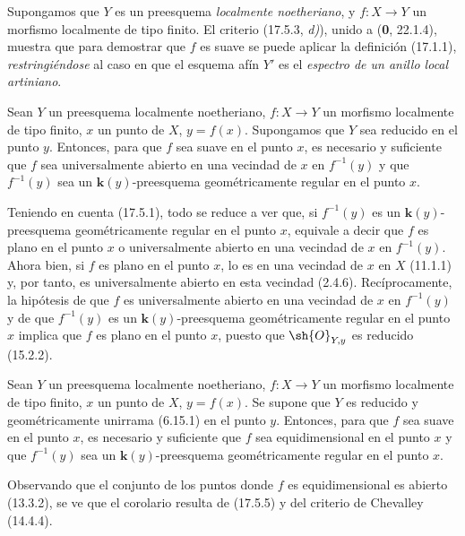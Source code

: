 \begin{remark}[17.5.4]
\label{IV.17.5.4}
Supongamos que $Y$ es un preesquema \emph{localmente noetheriano}, y $f:X\to Y$ un morfismo localmente de tipo finito. El criterio (17.5.3, \emph{d)}), unido a (\textbf 0, 22.1.4), muestra que para demostrar que $f$ es suave se puede aplicar la definición (17.1.1), \emph{restringiéndose} al caso en que el esquema afín $Y'$ es el \emph{espectro de un anillo local artiniano}.
\end{remark}

\begin{proposition}[17.5.5]
\label{IV.17.5.5}
Sean $Y$ un preesquema localmente noetheriano, $f:X\to Y$ un morfismo localmente de tipo finito, $x$ un punto de $X$, $y=f(x)$. Supongamos que $Y$ sea \textup{reducido} en el punto $y$. Entonces, para que $f$ sea suave en el punto $x$, es necesario y suficiente que $f$ sea universalmente abierto en una vecindad de $x$ en $f^{-1}(y)$ y que $f^{-1}(y)$ sea un $\boldsymbol{k}(y)$-preesquema geométricamente regular en el punto $x$.
\end{proposition}

Teniendo en cuenta (17.5.1), todo se reduce a ver que, si $f^{-1}(y)$ es un $\boldsymbol{k}(y)$-preesquema geométricamente regular en el punto $x$, equivale a decir que $f$ es plano en el punto $x$ o universalmente abierto en una vecindad de $x$ en $f^{-1}(y)$. Ahora bien, si $f$ es plano en el punto $x$, lo es en una vecindad de $x$ en $X$ (11.1.1) y, por tanto, es universalmente abierto en esta vecindad (2.4.6). Recíprocamente, la hipótesis de que $f$ es universalmente abierto en una vecindad de $x$ en $f^{-1}(y)$ y de que $f^{-1}(y)$ es un $\boldsymbol{k}(y)$-preesquema geométricamente regular en el punto $x$ implica que $f$ es plano en el punto $x$, puesto que $\sh{O}_{Y,y}$ es reducido (15.2.2).

\begin{corollary}[17.5.6]
\label{IV.17.5.6}
Sean $Y$ un preesquema localmente noetheriano, $f:X\to Y$ un morfismo localmente de tipo finito, $x$ un punto de $X$, $y=f(x)$. Se supone que $Y$ es \textup{reducido} y \textup{geométricamente unirrama (6.15.1)} en el punto $y$. Entonces, para que $f$ sea suave en el punto $x$, es necesario y suficiente que $f$ sea equidimensional en el punto $x$ y que $f^{-1}(y)$ sea un $\boldsymbol{k}(y)$-preesquema geométricamente regular en el punto $x$.
\end{corollary}

Observando que el conjunto de los puntos donde $f$ es equidimensional es abierto (13.3.2), se ve que el corolario resulta de (17.5.5) y del criterio de Chevalley (14.4.4).

